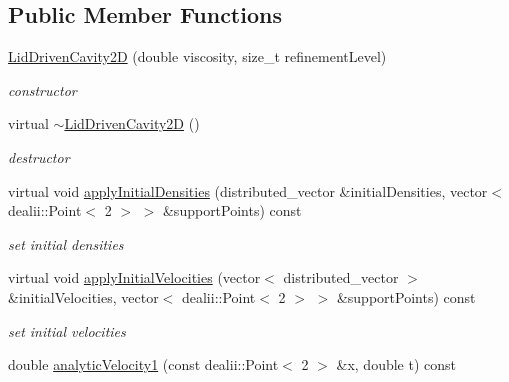 \subsection*{Public Member Functions}
\begin{DoxyCompactItemize}
\item 
\hyperlink{classnatrium_1_1LidDrivenCavity2D_a27c7eaba95a6876f6b4f4592b5afa104}{Lid\-Driven\-Cavity2\-D} (double viscosity, size\-\_\-t refinement\-Level)
\begin{DoxyCompactList}\small\item\em constructor \end{DoxyCompactList}\item 
\hypertarget{classnatrium_1_1LidDrivenCavity2D_a8ae5029b008eb3d3c810bae81440b29c}{virtual \hyperlink{classnatrium_1_1LidDrivenCavity2D_a8ae5029b008eb3d3c810bae81440b29c}{$\sim$\-Lid\-Driven\-Cavity2\-D} ()}\label{classnatrium_1_1LidDrivenCavity2D_a8ae5029b008eb3d3c810bae81440b29c}

\begin{DoxyCompactList}\small\item\em destructor \end{DoxyCompactList}\item 
virtual void \hyperlink{classnatrium_1_1LidDrivenCavity2D_aa01ed12f218d80ab0245fa89371c26cd}{apply\-Initial\-Densities} (distributed\-\_\-vector \&initial\-Densities, vector$<$ dealii\-::\-Point$<$ 2 $>$ $>$ \&support\-Points) const 
\begin{DoxyCompactList}\small\item\em set initial densities \end{DoxyCompactList}\item 
virtual void \hyperlink{classnatrium_1_1LidDrivenCavity2D_a9d5cdae26e13bc43d14f62b390c1d73a}{apply\-Initial\-Velocities} (vector$<$ distributed\-\_\-vector $>$ \&initial\-Velocities, vector$<$ dealii\-::\-Point$<$ 2 $>$ $>$ \&support\-Points) const 
\begin{DoxyCompactList}\small\item\em set initial velocities \end{DoxyCompactList}\item 
\hypertarget{classnatrium_1_1LidDrivenCavity2D_a35bd8e7b30690dd85f4c6931f62aaa53}{double \hyperlink{classnatrium_1_1LidDrivenCavity2D_a35bd8e7b30690dd85f4c6931f62aaa53}{analytic\-Velocity1} (const dealii\-::\-Point$<$ 2 $>$ \&x, double t) const }\label{classnatrium_1_1LidDrivenCavity2D_a35bd8e7b30690dd85f4c6931f62aaa53}


\end{DoxyCompactItemize}
